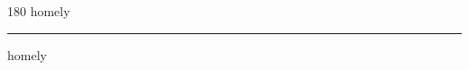 
\begin{frame}
\begin{center}
\begin{turn}{180}
{\fontsize{2.5cm}{1em}\selectfont homely}
\end{turn}
\vspace{1em}\par  
\hrule
\vspace{1em}\par  
{\fontsize{2.5cm}{1em}\selectfont homely}
\end{center}
\end{frame}

